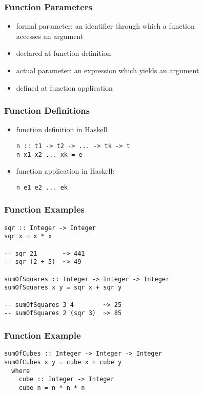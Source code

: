 \documentclass[dvipsnames]{beamer}
\theoremstyle{plain}
\begin{document}
\begin{frame}
  \frametitle{Function Parameters}

  \begin{itemize}
    \item \alert{formal parameter}: an identifier through which a function\\
      accesses an argument
    \item declared at function definition

    \pause
    \medskip
    \item \alert{actual parameter}: an expression which yields an argument
    \item defined at function application
  \end{itemize}
\end{frame}

\begin{frame}[fragile]
  \frametitle{Function Definitions}

  \begin{itemize}
    \item function definition in Haskell
    \begin{lstlisting}[style=syntax]
n :: t1 -> t2 -> ... -> tk -> t
n x1 x2 ... xk = e
    \end{lstlisting}

    \pause
    \bigskip
    \item function application in Haskell:
    \begin{lstlisting}[style=syntax]
n e1 e2 ... ek
    \end{lstlisting}
  \end{itemize}
\end{frame}

\begin{frame}[fragile]
  \frametitle{Function Examples}

  \begin{lstlisting}
sqr :: Integer -> Integer
sqr x = x * x

-- sqr 21       ~> 441
-- sqr (2 + 5)  ~> 49

sumOfSquares :: Integer -> Integer -> Integer
sumOfSquares x y = sqr x + sqr y

-- sumOfSquares 3 4        ~> 25
-- sumOfSquares 2 (sqr 3)  ~> 85
  \end{lstlisting}
\end{frame}

\begin{frame}[fragile]
  \frametitle{Function Example}

  \begin{lstlisting}
sumOfCubes :: Integer -> Integer -> Integer
sumOfCubes x y = cube x + cube y
  where
    cube :: Integer -> Integer
    cube n = n * n * n
  \end{lstlisting}
\end{frame}
\end{document}
